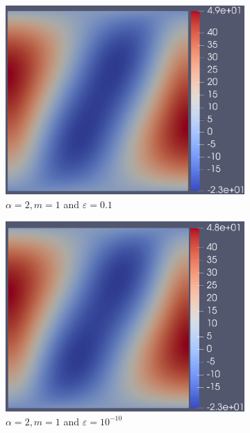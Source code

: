\documentclass[12pt]{ociamthesis}
\begin{document}
\begin{figure}[H]
\begin{subfigure}{0.44\textwidth}
     \includegraphics[width=\textwidth]{Pics/uf/F_E1b_eps1.png}
     \caption{$\alpha=2, m=1$ and $\varepsilon = 0.1$}
 \end{subfigure}
 \begin{subfigure}{0.44\textwidth}
     \includegraphics[width=\textwidth]{Pics/uf/F_E1b_eps_10.png}
     \caption{$\alpha=2, m=1$ and $\varepsilon = 10^{-10}$}
 \end{subfigure}
 \begin{subfigure}{0.44\textwidth}

\end{subfigure}
\end{figure}
\end{document}
